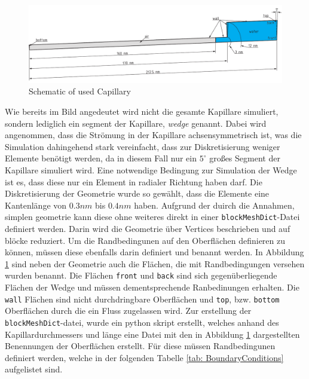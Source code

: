 \begin{figure}[h]
    \centering
    \includegraphics[width=.95\textwidth]{Pictures/Cap_5DEG.pdf}
    \caption{Schematic of used Capillary}
    \label{fig: Capillary Geometry}
\end{figure}
Wie bereits im Bild angedeutet wird nicht die gesamte Kapillare simuliert, sondern lediglich ein segment der Kapillare, \textit{wedge} genannt. Dabei wird angenommen, dass die Strömung in der Kapillare achsensymmetrisch ist, was die Simulation dahingehend stark vereinfacht, dass zur Diskretisierung weniger Elemente benötigt werden, da in diesem Fall nur ein $5^{\circ}$ großes Segment der Kapillare simuliert wird. Eine notwendige Bedingung zur Simulation der Wedge ist es, dass diese nur ein Element in radialer Richtung haben darf. 
Die Diskretisierung der Geometrie wurde so gewählt, dass die Elemente eine Kantenlänge von $0.3nm$ bis $0.4nm$ haben. Aufgrund der duirch die Annahmen, simplen geometrie kann diese ohne weiteres direkt in einer \texttt{blockMeshDict}-Datei definiert werden. Darin wird die Geometrie über Vertices beschrieben und auf blöcke reduziert. Um die Randbedingunen auf den Oberflächen definieren zu können, müssen diese ebenfalls darin definiert und benannt werden. In Abbildung \ref{fig: Capillary Geometry} sind neben der Geometrie auch die Flächen, die mit Randbedingungen versehen wurden benannt. Die Flächen \texttt{front} und \texttt{back} sind sich gegenüberliegende Flächen der Wedge und müssen dementsprechende Ranbedinungen erhalten. Die \texttt{wall} Flächen sind nicht durchdringbare Oberflächen und \texttt{top}, bzw. \texttt{bottom} Oberflächen durch die ein Fluss zugelassen wird. Zur erstellung der \texttt{blockMeshDict}-datei, wurde ein python skript erstellt, welches anhand des Kapillardurchmessers und länge eine Datei mit den in Abbildung \ref{fig: Capillary Geometry} dargestellten Benennungen der Oberflächen erstellt. Für diese müssen Randbedingunen definiert werden, welche in der folgenden Tabelle \ref{tab: BoundaryConditions} aufgelistet sind.

